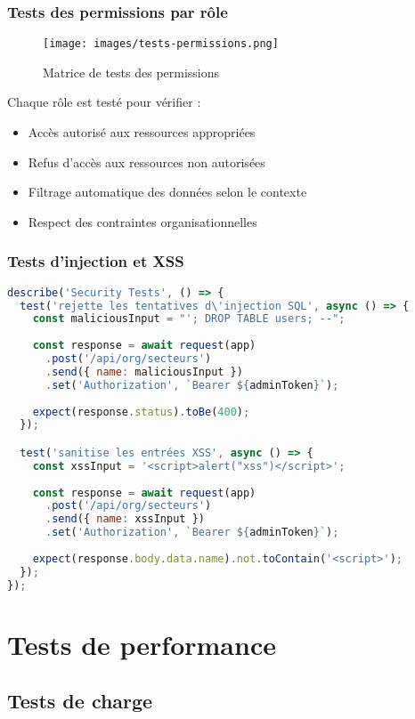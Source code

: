 \subsubsection{Tests des permissions par rôle}
\begin{figure}[h]
\centering
\texttt{[image: images/tests-permissions.png]}
\caption{Matrice de tests des permissions}
\label{fig:tests-permissions}
\end{figure}

Chaque rôle est testé pour vérifier :
\begin{itemize}
    \item Accès autorisé aux ressources appropriées
    \item Refus d'accès aux ressources non autorisées
    \item Filtrage automatique des données selon le contexte
    \item Respect des contraintes organisationnelles
\end{itemize}

\subsubsection{Tests d'injection et XSS}
\begin{lstlisting}[language=JavaScript, caption=Test de sécurité]
describe('Security Tests', () => {
  test('rejette les tentatives d\'injection SQL', async () => {
    const maliciousInput = "'; DROP TABLE users; --";
    
    const response = await request(app)
      .post('/api/org/secteurs')
      .send({ name: maliciousInput })
      .set('Authorization', `Bearer ${adminToken}`);
    
    expect(response.status).toBe(400);
  });

  test('sanitise les entrées XSS', async () => {
    const xssInput = '<script>alert("xss")</script>';
    
    const response = await request(app)
      .post('/api/org/secteurs')
      .send({ name: xssInput })
      .set('Authorization', `Bearer ${adminToken}`);
    
    expect(response.body.data.name).not.toContain('<script>');
  });
});
\end{lstlisting}

\section{Tests de performance}
\subsection{Tests de charge}
